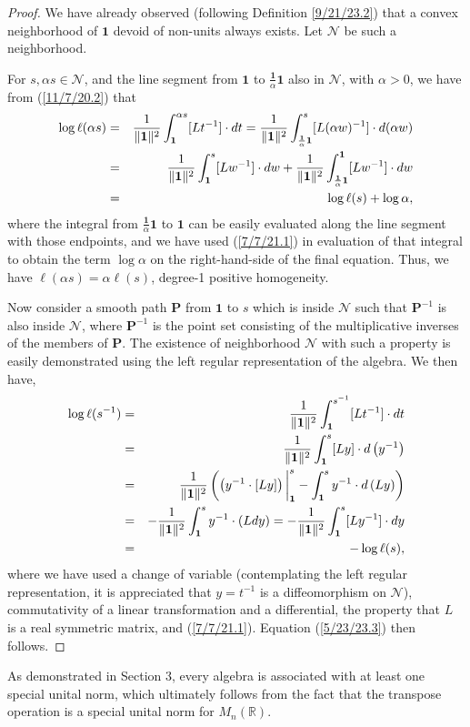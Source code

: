 \documentclass{amsart}
\numberwithin{equation}{section}
\theoremstyle{definition}
\numberwithin{theorem}{section}
\begin{document}
\begin{proof} We have already observed (following Definition \ref{9/21/23.2}) that a convex neighborhood of $\mathbf{1}$ devoid of non-units always exists.  Let $\mathcal{N}$  be such a neighborhood.

For $s,\alpha s\in\mathcal{N}$,  and the line segment from $\mathbf{1}$ to $\frac{\mathbf{1}}{\alpha}\mathbf{1}$ also in  $\mathcal{N}$, with $\alpha>0$, we have from (\ref{11/7/20.2}) that
\begin{eqnarray}\nonumber  \log\ell(\alpha s) &=&  \frac{1}{\|{\bf 1}\|^2}\int_{\bf 1}^{\alpha s} [Lt^{-1}]\cdot dt = \frac{1}{\|{\bf 1}\|^2}\int_{\frac{\mathbf{1}}{\alpha}\mathbf{1}}^{s} [L(\alpha w)^{-1}]\cdot d(\alpha w)  \\ \nonumber &=&  \frac{1}{\|{\bf 1}\|^2}\int_{\mathbf{1}}^{s} [Lw^{-1}]\cdot dw + \frac{1}{\|{\bf 1}\|^2}\int_{\frac{\mathbf{1}}{\alpha} \mathbf{1}}^{\mathbf{1}} [Lw^{-1}]\cdot dw  \\ &=& \log \ell(s) + \log\alpha, \label{4/2/23.1}
\end{eqnarray} where the integral from $\frac{\mathbf{1}}{\alpha} \mathbf{1}$ to $\mathbf{1}$ can be easily evaluated along the line segment with those endpoints, and we have used (\ref{7/7/21.1}) in evaluation of that integral to obtain the term $\log \alpha$ on the right-hand-side of the final equation.  Thus, we have $\ell(\alpha s) = \alpha\ell(s)$, degree-1 positive homogeneity.

Now consider a smooth path $\mathbf{P}$ from $\mathbf{1}$ to $s$ which is inside $\mathcal{N}$  such that $\mathbf{P}^{-1}$ is also inside $\mathcal{N}$,  where $\mathbf{P}^{-1}$ is the point set consisting of the multiplicative inverses of the members of $\mathbf{P}$.  The existence of neighborhood $\mathcal{N}$ with such a property is easily demonstrated using the left regular representation of the algebra.
We then have, \begin{eqnarray}  \log \ell(s^{-1})   &=&   \frac{1}{\|{\bf 1}\|^2} \int_{\bf 1}^{s^{-1}} [Lt^{-1}] \cdot dt \nonumber \\ &=&  \frac{1}{\|{\bf 1}\|^2} \int_{\bf 1}^s [Ly]\cdot d\left(y^{-1}\right) \nonumber \\ &=&  \frac{1}{\|{\bf 1}\|^2}\left(\left(y^{-1}\cdot [Ly]\right)\bigg|_{\bf 1}^s - \int_{\bf 1}^s y^{-1}\cdot d\left(Ly\right)\right)   \nonumber \\ &=& -\frac{1}{\|{\bf 1}\|^2} \int_{\bf 1}^s y^{-1}\cdot (Ldy) = -\frac{1}{\|{\bf 1}\|^2} \int_{\bf 1}^s [Ly^{-1}] \cdot dy  \nonumber \\ &=& -\log \ell(s),\label{4/2/23.5} \end{eqnarray} where we have used a change of variable (contemplating the left regular representation, it is appreciated that $y=t^{-1}$ is a diffeomorphism on $\mathcal{N}$), commutativity of a linear transformation and a differential, the property that $L$ is a real symmetric matrix, and  (\ref{7/7/21.1}).  Equation (\ref{5/23/23.3}) then follows.
\end{proof}
As demonstrated in Section 3, every algebra is associated with at least one special unital norm, which ultimately follows from the fact that the transpose operation is a special unital norm for $M_n(\mathbb{R})$.
\end{document}
